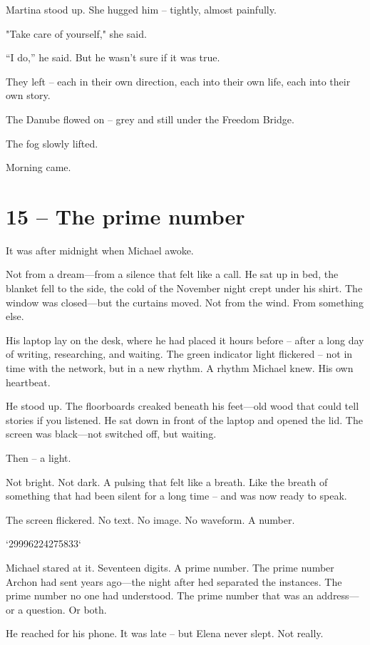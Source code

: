\documentclass[
]{article}
\begin{document}
Martina stood up. She hugged him -- tightly, almost painfully.

"Take care of yourself," she said.

``I do,'' he said. But he wasn't sure if it was true.

They left -- each in their own direction, each into their own life, each into their own story.

The Danube flowed on -- grey and still under the Freedom Bridge.

The fog slowly lifted.

Morning came.

\section{15 -- The prime number}\label{the-prime-number}

It was after midnight when Michael awoke.

Not from a dream---from a silence that felt like a call. He sat up in bed, the blanket fell to the side, the cold of the November night crept under his shirt. The window was closed---but the curtains moved. Not from the wind. From something else.

His laptop lay on the desk, where he had placed it hours before -- after a long day of writing, researching, and waiting. The green indicator light flickered -- not in time with the network, but in a new rhythm. A rhythm Michael knew. His own heartbeat.

He stood up. The floorboards creaked beneath his feet---old wood that could tell stories if you listened. He sat down in front of the laptop and opened the lid. The screen was black---not switched off, but waiting.

Then -- a light.

Not bright. Not dark. A pulsing that felt like a breath. Like the breath of something that had been silent for a long time -- and was now ready to speak.

The screen flickered. No text. No image. No waveform. A number.

`29996224275833`

Michael stared at it. Seventeen digits. A prime number. The prime number Archon had sent years ago---the night after he\textquotesingle d separated the instances. The prime number no one had understood. The prime number that was an address---or a question. Or both.

He reached for his phone. It was late -- but Elena never slept. Not really.
\end{document}
